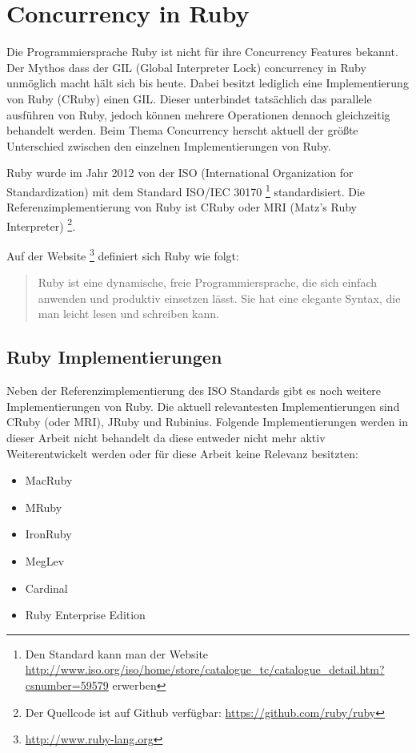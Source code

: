 \section{Concurrency in Ruby}
\label{section: Ruby}

Die Programmiersprache Ruby ist nicht für ihre Concurrency Features bekannt. Der Mythos dass der GIL (Global Interpreter Lock) concurrency in Ruby unmöglich macht hält sich bis heute. Dabei besitzt lediglich eine Implementierung von Ruby (CRuby) einen GIL. Dieser unterbindet tatsächlich das parallele ausführen von Ruby, jedoch können mehrere Operationen dennoch gleichzeitig behandelt werden. Beim Thema Concurrency herscht aktuell der größte Unterschied zwischen den einzelnen Implementierungen von Ruby.

Ruby wurde im Jahr 2012 von der ISO (International Organization for Standardization) mit dem Standard ISO/IEC 30170 \footnote{Den Standard kann man der Website \url{http://www.iso.org/iso/home/store/catalogue_tc/catalogue_detail.htm?csnumber=59579} erwerben} standardisiert. Die Referenzimplementierung von Ruby ist CRuby oder MRI (Matz's Ruby Interpreter) \footnote{Der Quellcode ist auf Github verfügbar: \url{https://github.com/ruby/ruby}}.

Auf der Website \footnote{\url{http://www.ruby-lang.org}} definiert sich Ruby wie folgt:

\begin{quote}
  Ruby ist eine dynamische, freie Programmiersprache, die sich einfach anwenden und produktiv einsetzen lässt. Sie hat eine elegante Syntax, die man leicht lesen und schreiben kann. \cite[]{Rub92}
\end{quote}

\subsection{Ruby Implementierungen}

Neben der Referenzimplementierung des ISO Standards gibt es noch weitere Implementierungen von Ruby. Die aktuell relevantesten Implementierungen sind CRuby (oder MRI), JRuby und Rubinius. Folgende Implementierungen werden in dieser Arbeit nicht behandelt da diese entweder nicht mehr aktiv Weiterentwickelt werden oder für diese Arbeit keine Relevanz besitzten:

\begin{itemize}
  \item MacRuby
  \item MRuby
  \item IronRuby
  \item MegLev
  \item Cardinal
  \item Ruby Enterprise Edition
\end{itemize}

